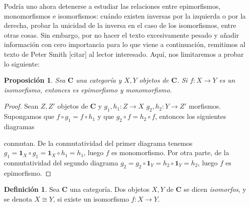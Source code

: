 \documentclass[12pt,a4paper]{book}
\newtheorem{prop}[thm]{Proposición}
\theoremstyle{definition} \newtheorem{defn}[thm]{Definición}
\theoremstyle{definition} \newtheorem{ejemplo}[thm]{Ejemplo}
\theoremstyle{definition} \newtheorem{ejercicio}[thm]{Ejercicio}
\theoremstyle{remark} \newtheorem*{obs}{Observación}
\def\id{\mathbf{1}}
\def\cat{\mathbf{C}}
\begin{document}
Podría uno ahora detenerse a estudiar las relaciones entre epimorfismos, monomorfismos e isomorfismos: cuándo existen inversas por la izquierda o por la derecha, probar la unicidad de la inversa en el caso de los isomorfismos, entre otras cosas. Sin embargo, por no hacer el texto excesivamente pesado y añadir información con cero importancia para lo que viene a continuación, remitimos al texto de Peter Smith [citar] al lector interesado. Aquí, nos limitaremos a probar lo siguiente:

\begin{prop}
  Sea $\cat$ una categoría y $X,Y$ objetos de $\cat$. Si $f:X\rightarrow Y$ es un isomorfismo, entonces es epimorfismo y monomorfismo.
\end{prop}
\begin{proof}
  Sean $Z,Z'$ objetos de $\cat$ y $g_1,h_1:Z\rightarrow X$ $g_2,h_2:Y\rightarrow Z'$ morfismos. Supongamos que $f\circ g_1= f\circ h_1$ y que $g_2 \circ f = h_2 \circ f$, entonces los siguientes diagramas
  \begin{center}
  \end{center}
  \begin{center}
  \end{center}
  conmutan. De la conmutatividad del primer diagrama tenemos $g_1=\id_X \circ g_1 = \id_X \circ h_1 = h_1$, luego $f$ es monomorfismo. Por otra parte, de la conmutatividad del segundo diagrama $g_2=g_2\circ\id_Y=h_2 \circ \id_Y=h_2$, luego $f$ es epimorfismo.
\end{proof}

\begin{defn}
  Sea $\cat$ una categoría. Dos objetos $X, Y$ de $\cat$ se dicen \emph{isomorfos}, y se denota $X\cong Y$, si existe un isomorfismo $f:X\rightarrow Y$.
\end{defn}
\end{document}
